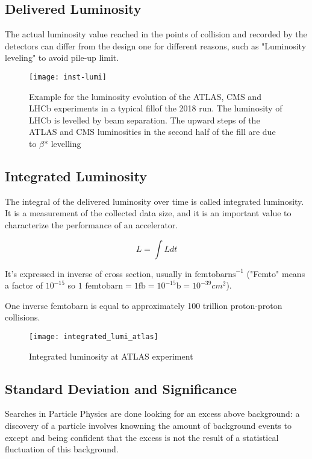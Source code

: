 \subsection{Delivered Luminosity}

The actual luminosity value reached in the points of collision and recorded by the detectors can differ from the design one for different reasons, such as "Luminosity leveling" to avoid pile-up limit.

\begin{figure}
	\centerline{
		\texttt{[image: inst-lumi]}}
	\caption{Example for the luminosity evolution of the ATLAS, CMS and LHCb experiments in a typical fillof the 2018 run. The luminosity of LHCb is levelled by beam separation. The upward steps of the ATLAS and CMS luminosities in the second half of the fill are due to $\beta\text{*}$ levelling
		\cite{Wenninger:2018cgs}}
\end{figure}


\subsection{Integrated Luminosity}

The integral of the delivered luminosity over time is called integrated luminosity. It is a measurement of the collected data size, and it is an important value to characterize the performance of an accelerator.

\begin{equation}
	L = \int Ldt
\end{equation}

It's expressed in inverse of cross section, usually in $\text{femtobarns}^{-1}$ ("Femto" means a factor of $10^{-15}$ so $\text{1 femtobarn} = 1 \text{fb} = 10^{-15} \text{b} = 10^{-39} cm^2 $).

One inverse femtobarn is equal to approximately 100 trillion proton-proton collisions.

\begin{figure}
	\centerline{
		\texttt{[image: integrated\_lumi\_atlas]}}
	\caption{Integrated luminosity at ATLAS experiment \cite{Bruce:2016iew}}
\end{figure}

\subsection{Standard Deviation and Significance}

Searches in Particle Physics are done looking for an excess above background: a discovery of a particle involves knowning the amount of background events to except and being confident that the excess is not the result of a statistical fluctuation of this background.

